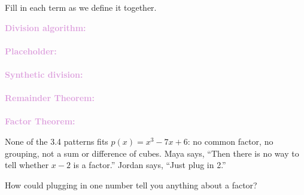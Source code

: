 \documentclass[10pt]{article}
\begin{document}

\vspace{0.12in}

\boxguard
\begin{vocabbox}
Fill in each term as we define it together.
\par\vspace{2pt}
\noindent\textbf{\textcolor{plum}{Division algorithm:}}\\[1pt]
\\[3pt]
\noindent\textbf{\textcolor{plum}{Placeholder:}}\\[1pt]
\\[3pt]
\noindent\textbf{\textcolor{plum}{Synthetic division:}}\\[1pt]
\\[3pt]
\noindent\textbf{\textcolor{plum}{Remainder Theorem:}}\\[1pt]
\\[3pt]
\noindent\textbf{\textcolor{plum}{Factor Theorem:}}\\[1pt]
\end{vocabbox}

\vspace{0.1in}

\boxguard
\begin{hookbox}
None of the 3.4 patterns fits $p(x) = x^3 - 7x + 6$: no common factor, no grouping, not a sum
or difference of cubes. Maya says, ``Then there is no way to tell whether $x - 2$ is a factor.''
Jordan says, ``Just plug in 2.''

How could plugging in one number tell you anything about a factor?
\end{hookbox}
\end{document}
